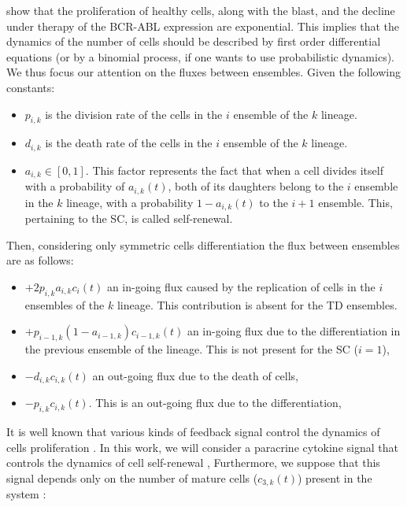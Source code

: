 \documentclass[a4paper,10pt]{article}
\begin{document}
show that the proliferation of healthy cells, along with the 
blast, and the decline under therapy of the BCR-ABL expression are exponential. 
This implies that the dynamics of the number of cells should be described
by first order differential equations
(or by a binomial process, if one wants to use probabilistic dynamics).\\
We thus focus our attention on the fluxes
between ensembles. Given the following constants:
\begin{itemize}
\item $p_{i,k}$ is the division rate of the cells in the $i$ ensemble of the $k$ lineage.
\item $d_{i,k}$ is the death rate of the cells in the $i$ ensemble of the $k$ lineage.
\item $a_{i,k}\in [0,1]$.
This factor represents the fact that when a cell divides itself
with a probability of $a_{i,k}(t)$, both of its daughters belong to the $i$ ensemble in the $k$ lineage,
with a probability $1-a_{i,k}(t)$ to the $i+1$ ensemble. This, pertaining to the SC, is called self-renewal.
\end{itemize}
Then, considering only symmetric cells differentiation
the flux between ensembles are as follows:
\begin{itemize}
\item $+2p_{i,k}a_{i,k}c_i(t)$ 
an in-going flux caused by the replication of cells in the $i$ ensembles of the $k$ lineage. 
This contribution is absent for the TD ensembles.
\item $+p_{i-1,k}(1-a_{i-1,k})c_{i-1,k}(t)$ 
an in-going flux due to the differentiation in the previous ensemble of the lineage. This is not present for the
SC ($i=1$),
\item $-d_{i,k}c_{i,k}(t)$ an out-going flux due to the death of cells, 
\item $-p_{i,k}c_{i,k}(t)$. This is an out-going flux due to the differentiation, 

\end{itemize}
It is well known that various kinds of feedback signal 
control the dynamics of cells proliferation 
\cite{layton1989evidence, metcalf2008hematopoietic, fried2009erythropoietin}.
In this work, we will consider a paracrine cytokine signal that 
controls the dynamics of cell self-renewal \cite{czochra, marciniak2013mathematical, stiehl2012mathematical, stiehl2018mathematical}, 
Furthermore, we suppose that this signal depends only on 
the number of mature cells ($c_{3,k}(t)$)
present in the system \cite{czochra}:
\end{document}
